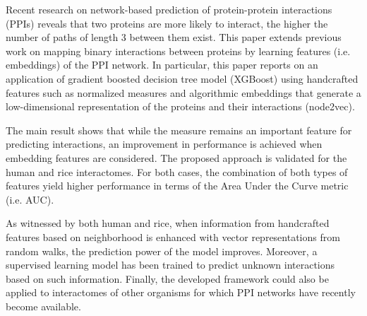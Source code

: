 Recent research on network-based prediction of protein-protein
interactions (PPIs) reveals that two proteins are more likely to interact,
the higher the number of paths of length 3 between them exist. This paper
extends previous work on mapping binary interactions between proteins 
by learning features (i.e. embeddings) of the PPI network. In particular, 
this paper reports on an application of gradient boosted decision tree
model (XGBoost) using handcrafted features  such as normalized measures 
and algorithmic embeddings that generate a low-dimensional representation
of the proteins and their interactions (node2vec).

The main result shows that while the measure remains an important feature
for predicting interactions, an improvement in performance is achieved when
embedding features are considered. The proposed approach is validated for
the human and rice interactomes. For both cases, the combination of both
types of features yield higher performance in terms of the Area Under the
Curve metric (i.e. AUC).

As witnessed by both human and rice, when information from 
handcrafted features based on neighborhood is enhanced with vector
representations from random walks, the prediction power of the model
improves. Moreover, a supervised learning model has been trained to predict
unknown interactions based on such information. Finally, the developed
framework could also be applied to interactomes of other organisms for which
PPI networks have recently become available.
